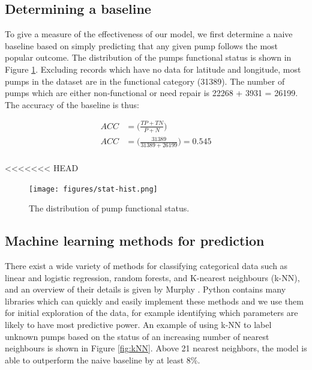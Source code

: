 \documentclass{article} %
\begin{document}
\subsection{Determining a baseline}

To give a measure of the effectiveness of our model, we first determine a naive baseline based on simply predicting that any given pump follows the most popular outcome. The distribution of the pumps functional status is shown in Figure \ref{fig:stat-hist}. Excluding records which have no data for latitude and longitude, most pumps in the dataset are in the functional category (31389). The number of pumps which are either non-functional or need repair is  22268 + 3931 = 26199. The accuracy of the baseline is thus:

\begin{align*}
ACC &= \Big(\frac{TP + TN}{P + N} \Big)\\
ACC &= \Big(\frac{31389}{31389 + 26199} \Big) = 0.545\\
\end{align*}

<<<<<<< HEAD
\begin{figure}
\centering
\texttt{[image: figures/stat-hist.png]}
\caption{The distribution of pump functional status.}
\label{fig:stat-hist}
\end{figure}

\subsection{Machine learning methods for prediction}

There exist a wide variety of methods for classifying categorical data such as linear and logistic regression, random forests, and K-nearest neighbours (k-NN), and an overview of their details is given by Murphy \cite{Murphy}. Python contains many libraries which can quickly and easily implement these methods and we use them for initial exploration of the data, for example identifying which parameters are likely to have most predictive power. An example of using k-NN to label unknown pumps based on the status of an increasing number of nearest neighbours is shown in Figure \ref{fig:kNN}. Above 21 nearest neighbors, the model is able to outperform the naive baseline by at least 8\%.
\end{document}
